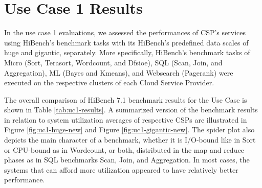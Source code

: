 \documentclass[review]{elsarticle}
\begin{document}
	
	
	\section{Use Case 1 Results}
	
	In the use case 1 evaluations, we assessed the performances of CSP's services using HiBench's benchmark tasks with its HiBench's predefined data scales of huge and gigantic, separately. More specifically, HiBench's benchmark tasks of Micro (Sort, Terasort, Wordcount, and Dfsioe), SQL (Scan, Join, and Aggregation), ML (Bayes and Kmeans), and Websearch (Pagerank) were executed on the respective clusters of each Cloud Service Provider. 
	
	The overall comparison of HiBench 7.1 benchmark results for the Use Case is shown in Table \ref{tab:uc1-results}. A summarized version of the benchmark results in relation to system utilization averages of respective CSPs are illustrated in Figure \ref{fig:uc1-huge-new} and Figure  \ref{fig:uc1-gigantic-new}. The spider plot also depicts the main character of a benchmark, whether it is I/O-bound like in Sort or CPU-bound as in Wordcount, or both, distributed in the map and reduce phases as in SQL benchmarks Scan, Join, and Aggregation. In most cases, the systems that can afford more utilization appeared to have relatively better performance.
	
\end{document}

